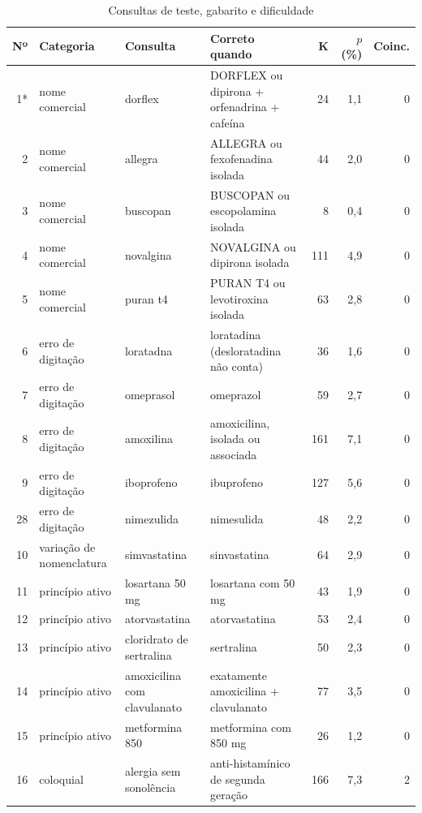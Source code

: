 \documentclass[12pt,oneside,a4paper,english,brazil]{abntex2}
\begin{document}
\begin{table}[p]
  \centering
  \caption{Consultas de teste, gabarito e dificuldade}
  \label{tab:consultas}
  \scriptsize
  \setlength{\tabcolsep}{4pt}
  \begin{tabular}{|r|p{1.9cm}|p{3.7cm}|p{5.2cm}|r|r|r|}
    \hline
    \textbf{Nº} & \textbf{Categoria} & \textbf{Consulta} & \textbf{Correto quando} & \textbf{K} & \textbf{$p$ (\%)} & \textbf{Coinc.} \\ \hline
    1* & nome comercial & dorflex & DORFLEX ou dipirona + orfenadrina + cafeína & 24 & 1,1 & 0 \\ \hline
    2 & nome comercial & allegra & ALLEGRA ou fexofenadina isolada & 44 & 2,0 & 0 \\ \hline
    3 & nome comercial & buscopan & BUSCOPAN ou escopolamina isolada & 8 & 0,4 & 0 \\ \hline
    4 & nome comercial & novalgina & NOVALGINA ou dipirona isolada & 111 & 4,9 & 0 \\ \hline
    5 & nome comercial & puran t4 & PURAN T4 ou levotiroxina isolada & 63 & 2,8 & 0 \\ \hline
    6 & erro de digitação & loratadna & loratadina (desloratadina não conta) & 36 & 1,6 & 0 \\ \hline
    7 & erro de digitação & omeprasol & omeprazol & 59 & 2,7 & 0 \\ \hline
    8 & erro de digitação & amoxilina & amoxicilina, isolada ou associada & 161 & 7,1 & 0 \\ \hline
    9 & erro de digitação & iboprofeno & ibuprofeno & 127 & 5,6 & 0 \\ \hline
    28 & erro de digitação & nimezulida & nimesulida & 48 & 2,2 & 0 \\ \hline
    10 & variação de nomenclatura & simvastatina & sinvastatina & 64 & 2,9 & 0 \\ \hline
    11 & princípio ativo & losartana 50 mg & losartana com 50 mg & 43 & 1,9 & 0 \\ \hline
    12 & princípio ativo & atorvastatina & atorvastatina & 53 & 2,4 & 0 \\ \hline
    13 & princípio ativo & cloridrato de sertralina & sertralina & 50 & 2,3 & 0 \\ \hline
    14 & princípio ativo & amoxicilina com clavulanato & exatamente amoxicilina + clavulanato & 77 & 3,5 & 0 \\ \hline
    15 & princípio ativo & metformina 850 & metformina com 850 mg & 26 & 1,2 & 0 \\ \hline
    16 & coloquial & alergia sem sonolência & anti-histamínico de segunda geração & 166 & 7,3 & 2 \\ \hline

\end{tabular}
\end{table}
\end{document}
